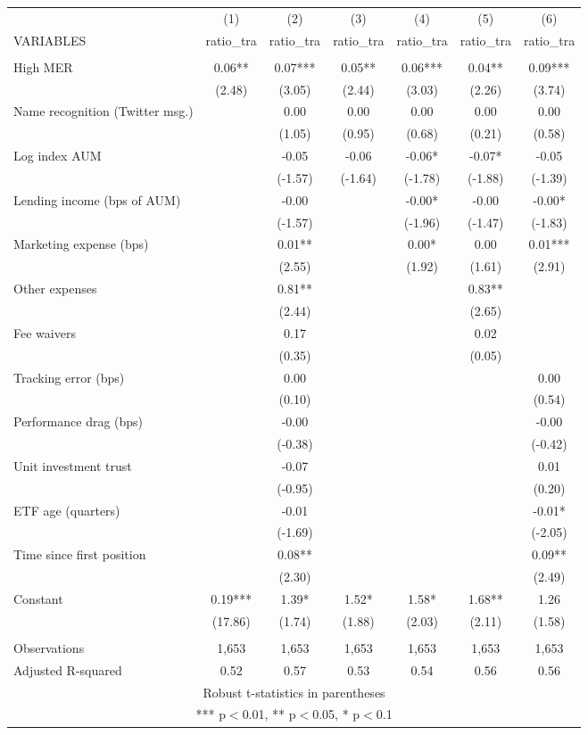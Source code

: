 \documentclass[]{article}
\begin{document}
\begin{tabular}{lcccccc} \hline
 & (1) & (2) & (3) & (4) & (5) & (6) \\
VARIABLES & ratio\_tra & ratio\_tra & ratio\_tra & ratio\_tra & ratio\_tra & ratio\_tra \\ \hline
 &  &  &  &  &  &  \\
High MER & 0.06** & 0.07*** & 0.05** & 0.06*** & 0.04** & 0.09*** \\
 & (2.48) & (3.05) & (2.44) & (3.03) & (2.26) & (3.74) \\
Name recognition (Twitter msg.) &  & 0.00 & 0.00 & 0.00 & 0.00 & 0.00 \\
 &  & (1.05) & (0.95) & (0.68) & (0.21) & (0.58) \\
Log index AUM &  & -0.05 & -0.06 & -0.06* & -0.07* & -0.05 \\
 &  & (-1.57) & (-1.64) & (-1.78) & (-1.88) & (-1.39) \\
Lending income (bps of AUM) &  & -0.00 &  & -0.00* & -0.00 & -0.00* \\
 &  & (-1.57) &  & (-1.96) & (-1.47) & (-1.83) \\
Marketing expense (bps) &  & 0.01** &  & 0.00* & 0.00 & 0.01*** \\
 &  & (2.55) &  & (1.92) & (1.61) & (2.91) \\
Other expenses &  & 0.81** &  &  & 0.83** &  \\
 &  & (2.44) &  &  & (2.65) &  \\
Fee waivers &  & 0.17 &  &  & 0.02 &  \\
 &  & (0.35) &  &  & (0.05) &  \\
Tracking error (bps) &  & 0.00 &  &  &  & 0.00 \\
 &  & (0.10) &  &  &  & (0.54) \\
Performance drag (bps) &  & -0.00 &  &  &  & -0.00 \\
 &  & (-0.38) &  &  &  & (-0.42) \\
Unit investment trust &  & -0.07 &  &  &  & 0.01 \\
 &  & (-0.95) &  &  &  & (0.20) \\
ETF age (quarters) &  & -0.01 &  &  &  & -0.01* \\
 &  & (-1.69) &  &  &  & (-2.05) \\
Time since first position &  & 0.08** &  &  &  & 0.09** \\
 &  & (2.30) &  &  &  & (2.49) \\
Constant & 0.19*** & 1.39* & 1.52* & 1.58* & 1.68** & 1.26 \\
 & (17.86) & (1.74) & (1.88) & (2.03) & (2.11) & (1.58) \\
 &  &  &  &  &  &  \\
Observations & 1,653 & 1,653 & 1,653 & 1,653 & 1,653 & 1,653 \\
 Adjusted R-squared & 0.52 & 0.57 & 0.53 & 0.54 & 0.56 & 0.56 \\ \hline
\multicolumn{7}{c}{ Robust t-statistics in parentheses} \\
\multicolumn{7}{c}{ *** p$<$0.01, ** p$<$0.05, * p$<$0.1} \\
\end{tabular}
\end{document}
